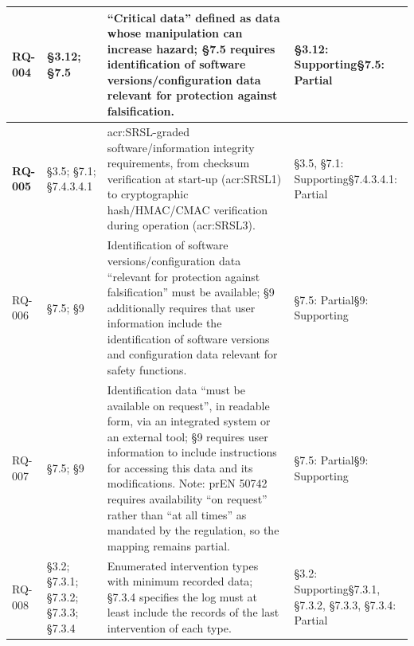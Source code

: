 \begin{longtable}{|>{\bfseries}p{1cm}|p{2.5cm}|p{9cm}|>{\centering\arraybackslash}p{2cm}|}
	RQ-004 &
	\S3.12;  \newline\S7.5 &
	``Critical data'' defined as data whose manipulation can increase hazard; \S7.5 requires identification of software versions/configuration data relevant for protection against falsification. &
	\S3.12: Supporting\newline\S7.5: Partial \\
	\hline
	
	RQ-005 &
	\S3.5;  \newline \S7.1;  \newline\S7.4.3.4.1 &
	\gls{acr:SRSL}-graded software/information integrity requirements, from checksum verification at start-up (\gls{acr:SRSL}1) to cryptographic hash/HMAC/CMAC verification during operation (\gls{acr:SRSL}3). &
	\S3.5, \S7.1: Supporting\newline\S7.4.3.4.1: Partial \\
	\hline
	
	
	RQ-006 &
	\S7.5;  \newline\S9 &
	Identification of software versions/configuration data ``relevant for protection against falsification'' must be available; \S9 additionally requires that user information include the identification of software versions and configuration data relevant for safety functions. &
	\S7.5: Partial\newline\S9: Supporting \\
	\hline
	
	RQ-007 &
	\S7.5; \newline \S9 &
	Identification data ``must be available on request'', in readable form, via an integrated system or an external tool; \S9 requires user information to include instructions for accessing this data and its modifications. Note: prEN 50742 requires availability ``on request'' rather than ``at all times'' as mandated by the regulation, so the mapping remains partial. &
	\S7.5: Partial\newline\S9: Supporting \\
	\hline
	
	RQ-008 &
	\S3.2;  \newline \S7.3.1;  \newline \S7.3.2;  \newline \S7.3.3;  \newline\S7.3.4 &
	Enumerated intervention types with minimum recorded data; \S7.3.4 specifies the log must at least include the records of the last intervention of each type. &
	\S3.2: Supporting\newline\S7.3.1, \S7.3.2, \S7.3.3, \S7.3.4: Partial\\
	\hline
	

\end{longtable}
